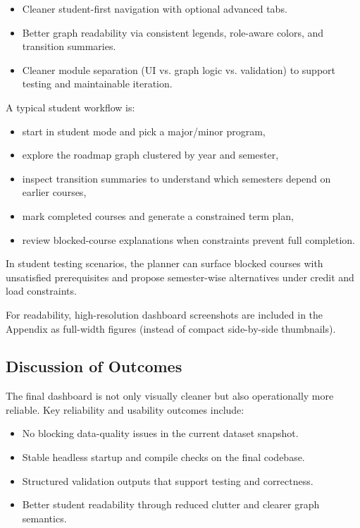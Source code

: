 \begin{itemize}
    \item Cleaner student-first navigation with optional advanced tabs.
    \item Better graph readability via consistent legends, role-aware colors,
    and transition summaries.
    \item Cleaner module separation (UI vs. graph logic vs. validation) to
    support testing and maintainable iteration.
\end{itemize}

A typical student workflow is:
\begin{itemize}
    \item start in student mode and pick a major/minor program,
    \item explore the roadmap graph clustered by year and semester,
    \item inspect transition summaries to understand which semesters depend on
    earlier courses,
    \item mark completed courses and generate a constrained term plan,
    \item review blocked-course explanations when constraints prevent full
    completion.
\end{itemize}

In student testing scenarios, the planner can surface blocked courses with
unsatisfied prerequisites and propose semester-wise alternatives under credit
and load constraints.

For readability, high-resolution dashboard screenshots are included in the
Appendix as full-width figures (instead of compact side-by-side thumbnails).

\subsection{Discussion of Outcomes}
The final dashboard is not only visually cleaner but also operationally more
reliable. Key reliability and usability outcomes include:

\begin{itemize}
    \item No blocking data-quality issues in the current dataset snapshot.
    \item Stable headless startup and compile checks on the final codebase.
    \item Structured validation outputs that support testing and correctness.
    \item Better student readability through reduced clutter and clearer graph
    semantics.
\end{itemize}

